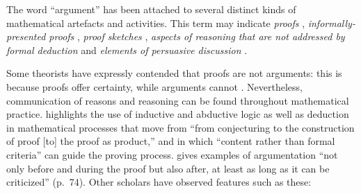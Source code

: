 \documentclass[smallextended,oneside]{svjour3}       %
\let\cite\citep
\begin{document}

The word ``argument'' has been attached to several distinct kinds of
mathematical artefacts and activities.  This term may indicate
\emph{proofs} \citet{gasteren1990shape},
\emph{informally-presented proofs} \cite{tanswell2015problem},
\emph{proof sketches} \cite{lamport1995write},
\emph{aspects of reasoning that are not addressed by formal deduction} \cite{Aberdein2013} and \emph{elements of persuasive discussion} \cite{Zack2001}.

Some theorists have expressly contended that proofs are not arguments:
this is because proofs offer certainty, while arguments cannot
\cite{Dufour2013}.
Nevertheless, communication of reasons and reasoning
can be found throughout mathematical practice.
\citet{pedemonte2007} highlights the use of inductive and abductive logic
as well as deduction in mathematical processes that move from
``from conjecturing to the construction of proof [to] the proof as
product,'' and in which ``content rather than formal criteria''
can guide the proving process.  \citet{Dufour2013} gives examples
of argumentation ``not only before and during the proof but also after,
at least as long as it can be criticized'' (p.~74).
Other scholars have observed features such as these:
\end{document}

